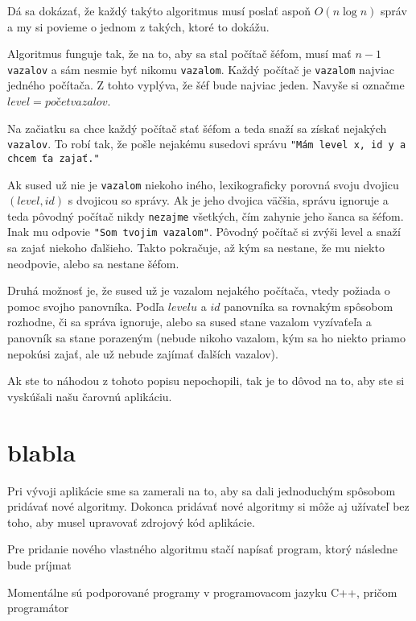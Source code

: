 Dá sa dokázať, že každý takýto algoritmus musí poslať aspoň $O(n\log n)$ správ a my si povieme o
jednom z takých, ktoré to dokážu.

Algoritmus funguje tak, že na to, aby sa stal počítač šéfom, musí mať $n-1$ \verb!vazalov! a sám nesmie byť
nikomu \verb!vazalom!. Každý počítač je \verb!vazalom! najviac jedného počítača. Z tohto vyplýva, že šéf bude
najviac jeden. Navyše si označme $level = počet vazalov$.

Na začiatku sa chce každý počítač stať šéfom a teda snaží sa získať nejakých \verb!vazalov!. To robí tak,
že pošle nejakému susedovi správu \verb!"Mám level x, id y a chcem ťa zajať."! 

Ak sused už nie je \verb!vazalom! niekoho iného, lexikograficky porovná svoju dvojicu $(level, id)$ s dvojicou so správy. 
Ak je jeho dvojica väčšia, správu ignoruje a teda pôvodný počítač nikdy \verb!nezajme! všetkých, čím zahynie jeho šanca sa šéfom. 
Inak mu odpovie \verb!"Som tvojim vazalom"!. Pôvodný počítač si zvýši level a snaží sa zajať niekoho
ďalšieho. Takto pokračuje, až kým sa nestane, že mu niekto neodpovie, alebo sa nestane šéfom.

Druhá možnosť je, že sused už je vazalom nejakého počítača, vtedy požiada o pomoc svojho panovníka.
Podľa $levelu$ a $id$ panovníka sa rovnakým spôsobom rozhodne, či sa správa ignoruje, alebo 
sa sused stane vazalom vyzívaťeľa a panovník sa stane porazeným (nebude nikoho vazalom, kým sa
ho niekto priamo nepokúsi zajať, ale už nebude zajímať ďalších vazalov).

Ak ste to náhodou z tohoto popisu nepochopili, tak je to dôvod na to, aby ste si vyskúšali našu
čarovnú aplikáciu. 




\section{blabla}

Pri vývoji aplikácie sme sa zamerali na to, aby sa dali jednoduchým spôsobom pridávať nové
algoritmy. Dokonca pridávať nové algoritmy si môže aj užívateľ bez toho, aby musel upravovať 
zdrojový kód aplikácie. 



Pre pridanie nového vlastného algoritmu stačí napísať program, ktorý následne bude príjmat 

Momentálne sú podporované programy v programovacom jazyku C++, pričom
programátor

